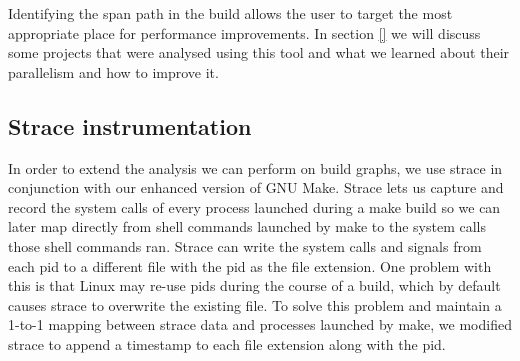 \documentclass[twocolumn,sigplan,10pt,review]{acmart}
\begin{document}
Identifying the span path in the build allows the user to target the most appropriate place
for performance improvements.  In section \ref{} we will discuss some projects that were analysed
using this tool and what we learned about their parallelism and how to improve it.





\subsection{Strace instrumentation}
\label{sec:straceinstr}

In order to extend the analysis we can perform on build graphs, we use strace \cite{} in
conjunction with our enhanced version of GNU Make.  Strace lets us capture and record the system
calls of every process launched during a make build so we can later map directly from shell
commands launched by make to the system calls those shell commands ran.  Strace can write the
system calls and signals from each pid to a different file with the pid as the file extension.
One problem with this is that Linux may re-use pids during the course of a build, which by default
causes strace to overwrite the existing file.  To solve this problem and maintain a 1-to-1
mapping between strace data and processes launched by make, we modified strace to append a
timestamp to each file extension along with the pid.
\end{document}
